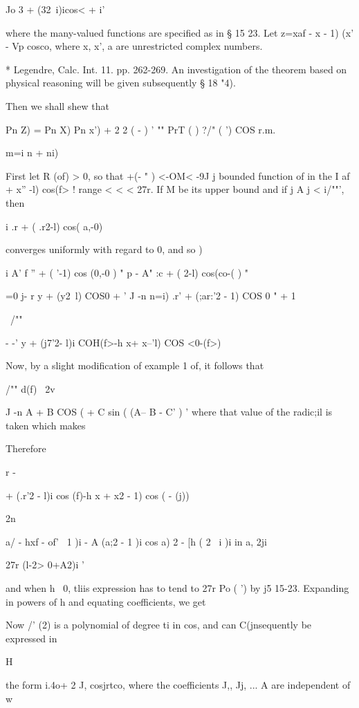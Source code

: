 {{{Jo 3 + (32\ i)icos< + i'

where the many-valued functions are specified as in § 15 23. 
Let z=xaf - x - 1)
(x' - Vp cosco, where x, x', a are unrestricted complex numbers.

* Legendre, Calc. Int. 11. pp. 262-269. An investigation of the
theorem based on physical reasoning will be given subsequently § 18
"4).

%
%

Then we shall shew that

Pn Z) = Pn X) Pn x') + 2 2 ( - ) ' "" PrT ( ) ?/" ( ') COS r.m.

m=i n + ni) \

First let R (of) > 0, so that +(- " ) <-OM< -9J j bounded function of
in the I af + x'' -l) cos(f> ! range < < < 27r. If M be its upper
bound and if j A j < i/""', then

i .r + ( .r2-l) cos( a,-0)

converges uniformly with regard to 0, and so )

i A' f '' + ( '-1) cos (0,-0 ) " p - A" :c + ( 2-l) cos(co-( ) "

 =0 j- r y + (y2\ l) COS0 + ' J -n n=i) .r' + (;ar:'2 - 1) COS 0 " + 1

\ /""

- -' y + (j7'2- l)i COH(f>-h x+ x--'l) COS <0-(f>)

Now, by a slight modification of example 1 of, it follows that

/"" d(f) \ 2v

J -n A + B COS ( + C sin ( (A-- B - C' ) ' where that value of the
radic;il is taken which makes

Therefore

r -

+ (.r'2 - l)i cos (f)-h x + x2 - 1) cos ( - (j))

2n

  a/ - hxf - of' \ 1 )i - A (a;2 - 1 )i cos a) 2 - [h ( 2 \ i )i in a,
2ji

27r (l-2> 0+A2)i '

and when h~ 0, tliis expression has to tend to 27r Po ( ') by j5
15-23. Expanding in powers of h and equating coefficients, we get

Now /' (2) is a polynomial of degree ti in cos, and can C(jnsequently
be expressed in

H

the form i.4o+ 2 J, cosjrtco, where the coefficients J,, Jj, ... A
are independent of w 

}}}
